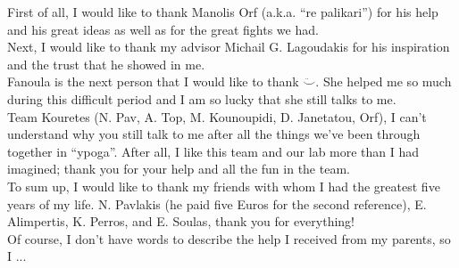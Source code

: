 \begin{acknowledgementslong}

\noindent
First of all, I would like to thank Manolis Orf (a.k.a. ``re palikari'') for his help and his great ideas as well as for the great fights we had. \\

\noindent
Next, I would like to thank my advisor Michail G. Lagoudakis for his inspiration and the trust that he showed in me.\\

\noindent
Fanoula is the next person that I would like to thank $\ddot\smile$. She helped me so much during this difficult period and I am so lucky that she still talks to me.\\

\noindent
Team Kouretes (N. Pav, A. Top, M. Kounoupidi, D. Janetatou, Orf), I can't understand why you still talk to me after all the things we've been through together in ``ypoga''. After all, I like this team and our lab more than I had imagined; thank you for your help and all the fun in the team.\\

\noindent
To sum up, I would like to thank my friends with whom I had the greatest five years of my life. N. Pavlakis (he paid five Euros for the second reference), E. Alimpertis, K. Perros, and E. Soulas, thank you for everything!\\

\noindent
Of course, I don't have words to describe the help I received from my parents, so I ...

\end{acknowledgementslong}